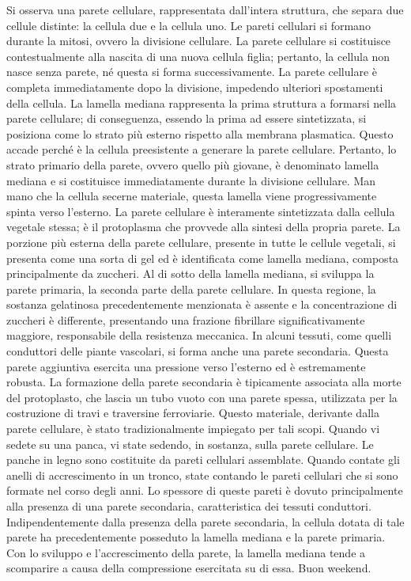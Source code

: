 \documentclass[11pt, a4paper]{article}
\begin{document}
\begin{spacing}{1}
Si osserva una parete cellulare, rappresentata dall'intera struttura, che separa due cellule distinte: la cellula due e la cellula uno. Le pareti cellulari si formano durante la mitosi, ovvero la divisione cellulare. La parete cellulare si costituisce contestualmente alla nascita di una nuova cellula figlia; pertanto, la cellula non nasce senza parete, né questa si forma successivamente. La parete cellulare è completa immediatamente dopo la divisione, impedendo ulteriori spostamenti della cellula.
La lamella mediana rappresenta la prima struttura a formarsi nella parete cellulare; di conseguenza, essendo la prima ad essere sintetizzata, si posiziona come lo strato più esterno rispetto alla membrana plasmatica. Questo accade perché è la cellula preesistente a generare la parete cellulare. Pertanto, lo strato primario della parete, ovvero quello più giovane, è denominato lamella mediana e si costituisce immediatamente durante la divisione cellulare. Man mano che la cellula secerne materiale, questa lamella viene progressivamente spinta verso l'esterno. La parete cellulare è interamente sintetizzata dalla cellula vegetale stessa; è il protoplasma che provvede alla sintesi della propria parete. La porzione più esterna della parete cellulare, presente in tutte le cellule vegetali, si presenta come una sorta di gel ed è identificata come lamella mediana, composta principalmente da zuccheri.
Al di sotto della lamella mediana, si sviluppa la parete primaria, la seconda parte della parete cellulare. In questa regione, la sostanza gelatinosa precedentemente menzionata è assente e la concentrazione di zuccheri è differente, presentando una frazione fibrillare significativamente maggiore, responsabile della resistenza meccanica. In alcuni tessuti, come quelli conduttori delle piante vascolari, si forma anche una parete secondaria. Questa parete aggiuntiva esercita una pressione verso l'esterno ed è estremamente robusta. La formazione della parete secondaria è tipicamente associata alla morte del protoplasto, che lascia un tubo vuoto con una parete spessa, utilizzata per la costruzione di travi e traversine ferroviarie. Questo materiale, derivante dalla parete cellulare, è stato tradizionalmente impiegato per tali scopi.
Quando vi sedete su una panca, vi state sedendo, in sostanza, sulla parete cellulare. Le panche in legno sono costituite da pareti cellulari assemblate. Quando contate gli anelli di accrescimento in un tronco, state contando le pareti cellulari che si sono formate nel corso degli anni. Lo spessore di queste pareti è dovuto principalmente alla presenza di una parete secondaria, caratteristica dei tessuti conduttori.
Indipendentemente dalla presenza della parete secondaria, la cellula dotata di tale parete ha precedentemente posseduto la lamella mediana e la parete primaria. Con lo sviluppo e l'accrescimento della parete, la lamella mediana tende a scomparire a causa della compressione esercitata su di essa.
Buon weekend.
\end{spacing}
\end{document}
